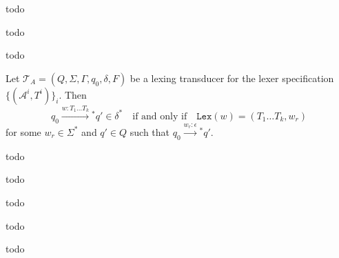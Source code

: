 \begin{definition}
    \label{def:Partial Lexer}
    todo
\end{definition}

\begin{definition}
    \label{def:Lexing Transducer}
    todo
\end{definition}

\begin{definition}[BuildLexingFST]
    \label{def:BuildLexingFST}
    todo
\end{definition}

\begin{theorem}
    \label{def:Lexing Transducer Equivalent}
    Let \(\mathcal{T}_A = (Q, \Sigma, \Gamma, q_0, \delta, F)\) be a lexing transducer for the lexer specification \(\{(\mathcal{A}^i, T^i)\}_i\). Then 
\[
    q_0 \xrightarrow{w : T_1 \ldots T_k}{}^* q' \in \delta^* \quad \text{if and only if} \quad \texttt{Lex}(w) = (T_1 \ldots T_k, w_r)
    \]
    for some \(w_r \in \Sigma^*\) and \(q' \in Q\) such that \(q_0 \xrightarrow{w_r : \epsilon}{}^* q'\).
\end{theorem}

\begin{definition}[LanguageModel]
    \label{def:LanguageModel}
    todo
\end{definition}

\begin{definition}[Detokenizer]
    \label{def:Detokenizer}
    todo
\end{definition}

\begin{definition}[BuildDetokenizingFST]
    \label{def:BuildDetokenizingFST}
    todo
\end{definition}

\begin{definition}[Parser]
    \label{def:Parser}
    todo
\end{definition}

\begin{definition}[PreprocessParser]
    \label{def:PreprocessParser}
    todo
\end{definition}
